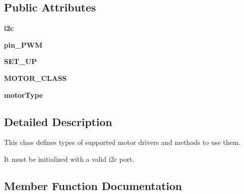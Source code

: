 \subsection*{Public Attributes}
\begin{DoxyCompactItemize}
\item 
\hypertarget{classH__Motor__CORE_1_1DC_aa22dfe3baf364d70a559c4579380b3fe}{}{\bfseries i2c}\label{classH__Motor__CORE_1_1DC_aa22dfe3baf364d70a559c4579380b3fe}

\item 
\hypertarget{classH__Motor__CORE_1_1DC_a01b37b502c890d24f8d1472374f560bc}{}{\bfseries pin\+\_\+\+P\+W\+M}\label{classH__Motor__CORE_1_1DC_a01b37b502c890d24f8d1472374f560bc}

\item 
\hypertarget{classH__Motor__CORE_1_1DC_a5763cdfce0d6369e293f57e62dcfbf1f}{}{\bfseries S\+E\+T\+\_\+\+U\+P}\label{classH__Motor__CORE_1_1DC_a5763cdfce0d6369e293f57e62dcfbf1f}

\item 
\hypertarget{classH__Motor__CORE_1_1DC_a34f87307e6792c35a76387ec598c7981}{}{\bfseries M\+O\+T\+O\+R\+\_\+\+C\+L\+A\+S\+S}\label{classH__Motor__CORE_1_1DC_a34f87307e6792c35a76387ec598c7981}

\item 
\hypertarget{classH__Motor__CORE_1_1DC_a0d70d40078d326896c4d24e0652abaf2}{}{\bfseries motor\+Type}\label{classH__Motor__CORE_1_1DC_a0d70d40078d326896c4d24e0652abaf2}

\end{DoxyCompactItemize}


\subsection{Detailed Description}
This class defines types of supported motor drivers and methods to use them. 

It must be initialized with a valid i2c port. 

\subsection{Member Function Documentation}
\hypertarget{classH__Motor__CORE_1_1DC_ad2cb6c12f26d6808deb4950afde67ddc}{}
